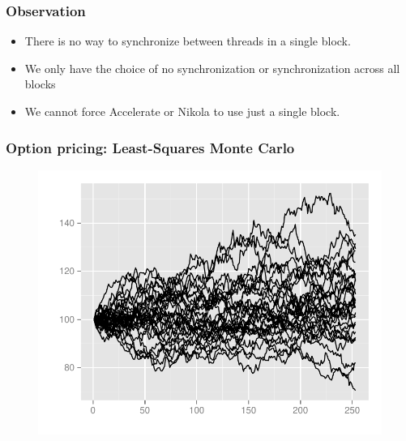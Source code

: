 \documentclass{beamer}
\begin{document}
\begin{frame}
  \frametitle{Observation}

  \begin{itemize}
  \item There is no way to synchronize between threads in a single
    block.
  \item We only have the choice of no synchronization or
    synchronization across all blocks
  \item We cannot force Accelerate or Nikola to use just a single
    block.
  \end{itemize}
\end{frame}

\begin{frame}
  \frametitle{Option pricing: Least-Squares Monte Carlo}
   \begin{figure}
       \centering
       \includegraphics[width=\textwidth]{graphics/lsmplot.pdf}
       \vspace{-5mm}
       \caption{}
   \label{fig:2dsobolseq}
 \end{figure}  
\end{frame}
\end{document}
